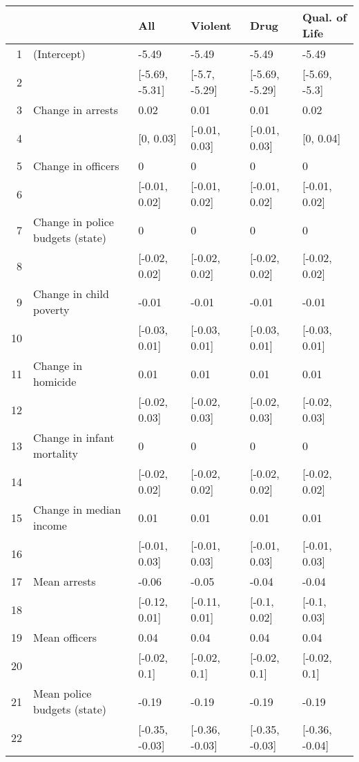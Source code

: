 \begin{table}[ht]
\centering
\begin{tabular}{rlllll}
  \hline
 &   & All & Violent & Drug & Qual. of Life \\ 
  \hline
1 & (Intercept) & -5.49 & -5.49 & -5.49 & -5.49 \\ 
  2 &  & [-5.69, -5.31] & [-5.7, -5.29] & [-5.69, -5.29] & [-5.69, -5.3] \\ 
  3 & Change in arrests & 0.02 & 0.01 & 0.01 & 0.02 \\ 
  4 &  & [0, 0.03] & [-0.01, 0.03] & [-0.01, 0.03] & [0, 0.04] \\ 
  5 & Change in officers & 0 & 0 & 0 & 0 \\ 
  6 &  & [-0.01, 0.02] & [-0.01, 0.02] & [-0.01, 0.02] & [-0.01, 0.02] \\ 
  7 & Change in police budgets (state) & 0 & 0 & 0 & 0 \\ 
  8 &  & [-0.02, 0.02] & [-0.02, 0.02] & [-0.02, 0.02] & [-0.02, 0.02] \\ 
  9 & Change in child poverty & -0.01 & -0.01 & -0.01 & -0.01 \\ 
  10 &  & [-0.03, 0.01] & [-0.03, 0.01] & [-0.03, 0.01] & [-0.03, 0.01] \\ 
  11 & Change in homicide & 0.01 & 0.01 & 0.01 & 0.01 \\ 
  12 &  & [-0.02, 0.03] & [-0.02, 0.03] & [-0.02, 0.03] & [-0.02, 0.03] \\ 
  13 & Change in infant mortality & 0 & 0 & 0 & 0 \\ 
  14 &  & [-0.02, 0.02] & [-0.02, 0.02] & [-0.02, 0.02] & [-0.02, 0.02] \\ 
  15 & Change in median income & 0.01 & 0.01 & 0.01 & 0.01 \\ 
  16 &  & [-0.01, 0.03] & [-0.01, 0.03] & [-0.01, 0.03] & [-0.01, 0.03] \\ 
  17 & Mean arrests & -0.06 & -0.05 & -0.04 & -0.04 \\ 
  18 &  & [-0.12, 0.01] & [-0.11, 0.01] & [-0.1, 0.02] & [-0.1, 0.03] \\ 
  19 & Mean officers & 0.04 & 0.04 & 0.04 & 0.04 \\ 
  20 &  & [-0.02, 0.1] & [-0.02, 0.1] & [-0.02, 0.1] & [-0.02, 0.1] \\ 
  21 & Mean police budgets (state) & -0.19 & -0.19 & -0.19 & -0.19 \\ 
  22 &  & [-0.35, -0.03] & [-0.36, -0.03] & [-0.35, -0.03] & [-0.36, -0.04] \\ 

\end{tabular}
\end{table}
